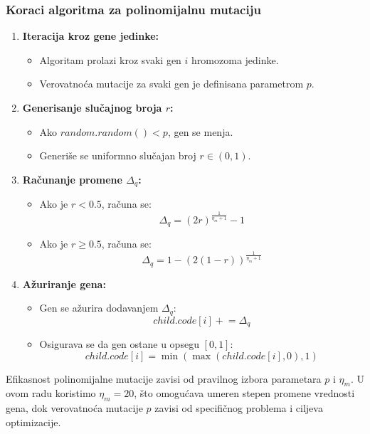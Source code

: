 \documentclass[12pt]{article}
\begin{document}
\subsubsection*{Koraci algoritma za polinomijalnu mutaciju}
\begin{enumerate}
    \item \textbf{Iteracija kroz gene jedinke:}
    \begin{itemize}
        \item Algoritam prolazi kroz svaki gen $i$ hromozoma jedinke.
        \item Verovatnoća mutacije za svaki gen je definisana parametrom $p$.
    \end{itemize}

    \item \textbf{Generisanje slučajnog broja $r$:}
    \begin{itemize}
        \item Ako $random.random() < p$, gen se menja.
        \item Generiše se uniformno slučajan broj $r \in (0,1)$.
    \end{itemize}

    \item \textbf{Računanje promene $\Delta_q$:}
    \begin{itemize}
        \item Ako je $r < 0.5$, računa se:
        \[
        \Delta_q = (2r)^{\frac{1}{\eta_m + 1}} - 1
        \]
        \item Ako je $r \geq 0.5$, računa se:
        \[
        \Delta_q = 1 - (2(1 - r))^{\frac{1}{\eta_m + 1}}
        \]
    \end{itemize}

    \item \textbf{Ažuriranje gena:}
    \begin{itemize}
        \item Gen se ažurira dodavanjem $\Delta_q$:
        \[
        child.code[i] \mathrel{+}= \Delta_q
        \]
        \item Osigurava se da gen ostane u opsegu $[0,1]$:
        \[
        child.code[i] = \min(\max(child.code[i], 0), 1)
        \]
    \end{itemize}
\end{enumerate}

Efikasnost polinomijalne mutacije zavisi od pravilnog izbora parametara $p$ i $\eta_m$. U ovom radu koristimo $\eta_m = 20$, što omogućava umeren stepen promene vrednosti gena, dok verovatnoća mutacije $p$ zavisi od specifičnog problema i ciljeva optimizacije.
\end{document}
